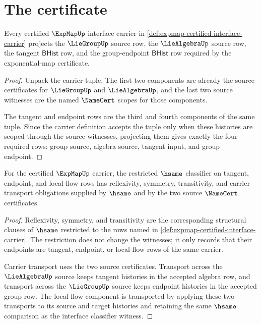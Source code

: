 \section{The certificate}
\label{sec:expmap-certificate}

\begin{theorem}
\label{thm:expmap-carrier-source-obligations}
Every certified $\ExpMapUp$ interface carrier in \autoref{def:expmap-certified-interface-carrier} projects the $\LieGroupUp$ source row, the $\LieAlgebraUp$ source row, the tangent $\mathsf{BHist}$ row, and the group-endpoint $\mathsf{BHist}$ row required by the exponential-map certificate.
\end{theorem}
\begin{proof}
Unpack the carrier tuple. The first two components are already the source certificates for $\LieGroupUp$ and $\LieAlgebraUp$, and the last two source witnesses are the named $\NameCert$ scopes for those components.

The tangent and endpoint rows are the third and fourth components of the same tuple. Since the carrier definition accepts the tuple only when these histories are scoped through the source witnesses, projecting them gives exactly the four required rows: group source, algebra source, tangent input, and group endpoint.
\end{proof}

\begin{theorem}
\label{thm:expmap-classifier-stability-obligations}
For the certified $\ExpMapUp$ carrier, the restricted $\hsame$ classifier on tangent, endpoint, and local-flow rows has reflexivity, symmetry, transitivity, and carrier transport obligations supplied by $\hsame$ and by the two source $\NameCert$ certificates.
\end{theorem}
\begin{proof}
Reflexivity, symmetry, and transitivity are the corresponding structural clauses of $\hsame$ restricted to the rows named in \autoref{def:expmap-certified-interface-carrier}. The restriction does not change the witnesses; it only records that their endpoints are tangent, endpoint, or local-flow rows of the same carrier.

Carrier transport uses the two source certificates. Transport across the $\LieAlgebraUp$ source keeps tangent histories in the accepted algebra row, and transport across the $\LieGroupUp$ source keeps endpoint histories in the accepted group row. The local-flow component is transported by applying these two transports to its source and target histories and retaining the same $\hsame$ comparison as the interface classifier witness.
\end{proof}

